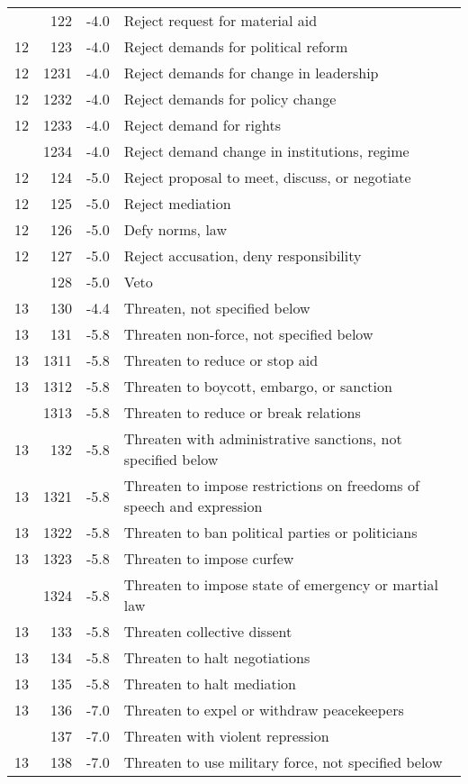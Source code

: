 \documentclass[10pt,]{article}
\begin{document}
\begin{longtable}[t]{rrrl}
\addlinespace
12 & 122 & -4.0 & Reject request for material aid\\
12 & 123 & -4.0 & Reject demands for political reform\\
12 & 1231 & -4.0 & Reject demands for change in leadership\\
12 & 1232 & -4.0 & Reject demands for policy change\\
12 & 1233 & -4.0 & Reject demand for rights\\
\addlinespace
12 & 1234 & -4.0 & Reject demand change in institutions, regime\\
12 & 124 & -5.0 & Reject proposal to meet, discuss, or negotiate\\
12 & 125 & -5.0 & Reject mediation\\
12 & 126 & -5.0 & Defy norms, law\\
12 & 127 & -5.0 & Reject accusation, deny responsibility\\
\addlinespace
12 & 128 & -5.0 & Veto\\
13 & 130 & -4.4 & Threaten, not specified below\\
13 & 131 & -5.8 & Threaten non-force, not specified below\\
13 & 1311 & -5.8 & Threaten to reduce or stop aid\\
13 & 1312 & -5.8 & Threaten to boycott, embargo, or sanction\\
\addlinespace
13 & 1313 & -5.8 & Threaten to reduce or break relations\\
13 & 132 & -5.8 & Threaten with administrative sanctions, not specified below\\
13 & 1321 & -5.8 & Threaten to impose restrictions on freedoms of speech and expression\\
13 & 1322 & -5.8 & Threaten to ban political parties or politicians\\
13 & 1323 & -5.8 & Threaten to impose curfew\\
\addlinespace
13 & 1324 & -5.8 & Threaten to impose state of emergency or martial law\\
13 & 133 & -5.8 & Threaten collective dissent\\
13 & 134 & -5.8 & Threaten to halt negotiations\\
13 & 135 & -5.8 & Threaten to halt mediation\\
13 & 136 & -7.0 & Threaten to expel or withdraw peacekeepers\\
\addlinespace
13 & 137 & -7.0 & Threaten with violent repression\\
13 & 138 & -7.0 & Threaten to use military force, not specified below\\

\end{longtable}
\end{document}
